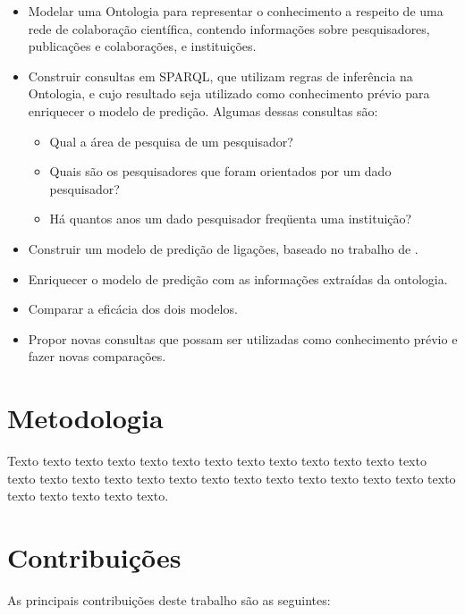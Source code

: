 \begin{itemize}
    \item Modelar uma Ontologia para representar o conhecimento a respeito de uma rede de colaboração científica, contendo informações sobre pesquisadores, publicações e colaborações, e instituições.
    \item Construir consultas em SPARQL, que utilizam regras de inferência na Ontologia, e cujo resultado seja utilizado como conhecimento prévio para enriquecer o modelo de predição. Algumas dessas consultas são:
    \begin{itemize}
        \item Qual a área de pesquisa de um pesquisador?
        \item Quais são os pesquisadores que foram orientados por um dado pesquisador?
        \item Há quantos anos um dado pesquisador freqüenta uma instituição?
    \end{itemize}
    \item Construir um modelo de predição de ligações, baseado no trabalho de \citet{Cervantes2014}.
    \item Enriquecer o modelo de predição com as informações extraídas da ontologia.
    \item Comparar a eficácia dos dois modelos.
    \item Propor novas consultas que possam ser utilizadas como conhecimento prévio e fazer novas comparações.
\end{itemize}

\section{Metodologia}
\label{sec:metodologia}

Texto texto texto texto texto texto texto texto texto texto texto texto texto
texto texto texto texto texto texto texto texto texto texto texto texto texto
texto texto texto texto texto texto.

\section{Contribuições}
\label{sec:contribucoes}

As principais contribuições deste trabalho são as seguintes:

